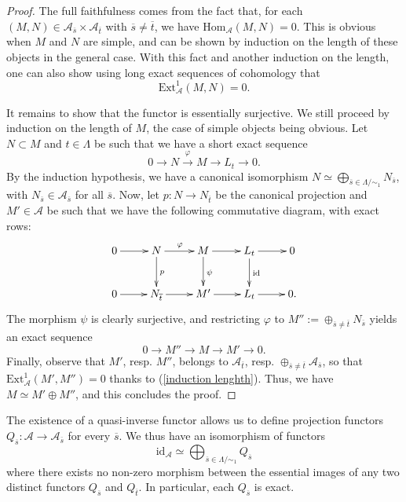 \documentclass[11pt]{amsart}
\theoremstyle{plain}
\theoremstyle{remark}
\numberwithin{equation}{section}
\begin{document}
	\begin{proof}
		The full faithfulness comes from the fact that, for each $(M,N)\in\mathcal{A}_{\overline{s}}\times\mathcal{A}_{\overline{t}}$ with $\overline{s}\neq\overline{t}$, we have $\mathrm{Hom}_\mathcal{A}(M,N)=0$. This is obvious when $M$ and $N$ are simple, and can be shown by induction on the length of these objects in the general case. With this fact and another induction on the length, one can also show using long exact sequences of cohomology that 
		\begin{equation}\label{induction lenghth}
		    \mathrm{Ext}^1_\mathcal{A}(M,N)=0.
		\end{equation}
		
		It remains to show that the functor is essentially surjective. We still proceed by induction on the length of $M$, the case of simple objects being obvious. Let $N\subset M$ and $t\in\Lambda$ be such that we have a short exact sequence
		\begin{equation}\label{exact sequence}
		    0 \rightarrow N\xrightarrow{\varphi} M\rightarrow L_t\rightarrow 0.
		\end{equation}
		By the induction hypothesis, we have a canonical isomorphism $N\simeq \bigoplus_{\overline{s}\in\Lambda/\sim_1}N_{\overline{s}}$, with $N_{\overline{s}}\in \mathcal{A}_{\overline{s}}$ for all $\overline{s}$.
		Now, let $p:N\to N_{\overline{t}}$ be the canonical projection and $M'\in\mathcal{A}$ be such that we have the following commutative diagram, with exact rows:
		$$\xymatrix{
    0\ar[r] & N\ar[r]^{\varphi} \ar[d]^{p} &  M \ar[r] \ar[d]^{\psi} & L_t \ar[r]\ar[d]^{\mathrm{id}} & 0 \\
     0\ar[r] & N_{\overline{t}}\ar[r] &  M' \ar[r] & L_t \ar[r] & 0.
  }$$
  The morphism $\psi$ is clearly surjective, and restricting $\varphi$ to $M'':=\oplus_{\overline{s}\neq\overline{t}}N_{\overline{s}}$ yields an exact sequence
  $$0 \rightarrow M''\rightarrow M\rightarrow M'\rightarrow 0. $$
  Finally, observe that $M'$, resp. $M''$, belongs to  $\mathcal{A}_{\overline{t}}$, resp. $\oplus_{\overline{s}\neq\overline{t}}\mathcal{A}_{\overline{s}}$, so that $\mathrm{Ext}^1_\mathcal{A}(M',M'')=0$ thanks to (\ref{induction lenghth}). Thus, we have $M\simeq M'\oplus M''$, and this concludes the proof.
	\end{proof}
	The existence of a quasi-inverse functor allows us to define projection functors $Q_{\overline{s}}:\mathcal{A}\to \mathcal{A}_{\overline{s}}$ for every $\overline{s}$. We thus have an isomorphism of functors
	\begin{equation}\label{eq1}
		\mathrm{id}_\mathcal{A}\simeq \bigoplus_{\overline{s}\in\Lambda/\sim_1} Q_{\overline{s}}
	\end{equation}
	where there exists no non-zero morphism between the essential images of any two distinct functors $Q_{\overline{s}}$ and $Q_{\overline{t}}$. In particular, each $Q_{\overline{s}}$ is exact.
	
\end{document}
